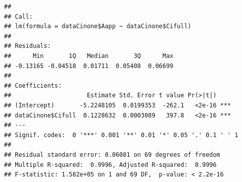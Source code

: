 \documentclass[
]{krantz}
\makeatletter
\newenvironment{Shaded}{\begin{snugshade}}{\end{snugshade}}
\newcommand{\CommentTok}[1]{\textcolor[rgb]{0.56,0.35,0.01}{\textit{#1}}}
\newcommand{\DecValTok}[1]{\textcolor[rgb]{0.00,0.00,0.81}{#1}}
\newcommand{\KeywordTok}[1]{\textcolor[rgb]{0.13,0.29,0.53}{\textbf{#1}}}
\newcommand{\NormalTok}[1]{#1}
\newcommand{\OperatorTok}[1]{\textcolor[rgb]{0.81,0.36,0.00}{\textbf{#1}}}
\newcommand{\StringTok}[1]{\textcolor[rgb]{0.31,0.60,0.02}{#1}}
\newenvironment{kframe}{%
\medskip{}
\setlength{\fboxsep}{.8em}
 \def\at@end@of@kframe{}%
 \ifinner\ifhmode%
  \def\at@end@of@kframe{\end{minipage}}%
  \begin{minipage}{\columnwidth}%
 \fi\fi%
 \def\FrameCommand##1{\hskip\@totalleftmargin \hskip-\fboxsep
 \colorbox{shadecolor}{##1}\hskip-\fboxsep
     \hskip-\linewidth \hskip-\@totalleftmargin \hskip\columnwidth}%
 \MakeFramed {\advance\hsize-\width
   \@totalleftmargin\z@ \linewidth\hsize
   \@setminipage}}%
 {\par\unskip\endMakeFramed%
 \at@end@of@kframe}
\renewenvironment{Shaded}{\begin{kframe}}{\end{kframe}}
\makeatother
\begin{document}
\begin{Shaded}
\end{Shaded}

\begin{verbatim}
## 
## Call:
## lm(formula = dataCinone$Aapp ~ dataCinone$Cifull)
## 
## Residuals:
##      Min       1Q   Median       3Q      Max 
## -0.13165 -0.04518  0.01711  0.05408  0.06699 
## 
## Coefficients:
##                     Estimate Std. Error t value Pr(>|t|)    
## (Intercept)       -5.2248105  0.0199353  -262.1   <2e-16 ***
## dataCinone$Cifull  0.1228632  0.0003089   397.8   <2e-16 ***
## ---
## Signif. codes:  0 '***' 0.001 '**' 0.01 '*' 0.05 '.' 0.1 ' ' 1
## 
## Residual standard error: 0.06081 on 69 degrees of freedom
## Multiple R-squared:  0.9996,	Adjusted R-squared:  0.9996 
## F-statistic: 1.582e+05 on 1 and 69 DF,  p-value: < 2.2e-16
\end{verbatim}
\end{document}
